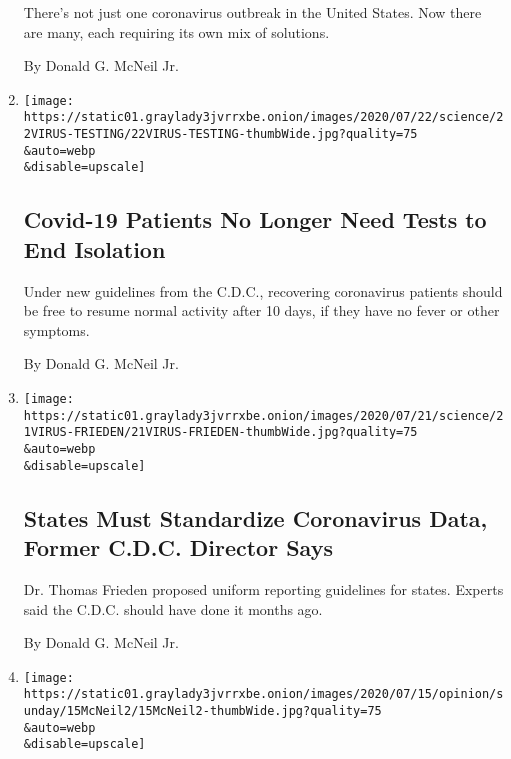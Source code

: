 \begin{enumerate}
  There's not just one coronavirus outbreak in the United States. Now
  there are many, each requiring its own mix of solutions.

  By Donald G. McNeil Jr.
\item
  \href{/2020/07/22/health/coronavirus-isolation-testing.html}{}

  \texttt{[image: https://static01.graylady3jvrrxbe.onion/images/2020/07/22/science/22VIRUS-TESTING/22VIRUS-TESTING-thumbWide.jpg?quality=75\\\&auto=webp\\\&disable=upscale]}

  \hypertarget{covid-19-patients-no-longer-need-tests-to-end-isolation}{%
  \subsection{Covid-19 Patients No Longer Need Tests to End
  Isolation}\label{covid-19-patients-no-longer-need-tests-to-end-isolation}}

  Under new guidelines from the C.D.C., recovering coronavirus patients
  should be free to resume normal activity after 10 days, if they have
  no fever or other symptoms.

  By Donald G. McNeil Jr.
\item
  \href{/2020/07/21/health/coronavirus-data-states-cdc.html}{}

  \texttt{[image: https://static01.graylady3jvrrxbe.onion/images/2020/07/21/science/21VIRUS-FRIEDEN/21VIRUS-FRIEDEN-thumbWide.jpg?quality=75\\\&auto=webp\\\&disable=upscale]}

  \hypertarget{states-must-standardize-coronavirus-data-former-cdc-director-says}{%
  \subsection{States Must Standardize Coronavirus Data, Former C.D.C.
  Director
  Says}\label{states-must-standardize-coronavirus-data-former-cdc-director-says}}

  Dr. Thomas Frieden proposed uniform reporting guidelines for states.
  Experts said the C.D.C. should have done it months ago.

  By Donald G. McNeil Jr.
\item
  \href{/2020/07/15/sunday-review/coronavirus-history-pandemics.html}{}

  \texttt{[image: https://static01.graylady3jvrrxbe.onion/images/2020/07/15/opinion/sunday/15McNeil2/15McNeil2-thumbWide.jpg?quality=75\\\&auto=webp\\\&disable=upscale]}

  \hypertarget{news-analysis}{%
}
\end{enumerate}
